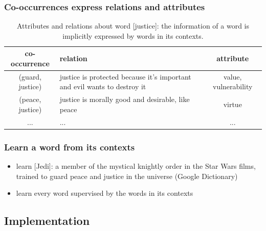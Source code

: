 \documentclass{article}
\begin{document}
\subsubsection{Co-occurrences express relations and attributes}
\begin{table}[H]
	\centering
	\begin{tabularx}{\textwidth}{|c|X|c|} \hline
		co-occurrence & relation & attribute \\ \hline
		(guard, justice) & justice is protected because it's important and evil wants to destroy it & value, vulnerability \\ \hline
		(peace, justice) & justice is morally good and desirable, like peace & virtue \\ \hline
		... & ... & ... \\ \hline
	\end{tabularx}
	\caption{Attributes and relations about word [justice]: the information of a word is implicitly expressed by words in its contexts.}
	\label{tab:cooccurrences}
\end{table}
\subsubsection{Learn a word from its contexts}
\begin{itemize}
	\item learn [Jedi]: a member of the mystical knightly order in the Star Wars films, trained to guard peace and justice in the universe (Google Dictionary)
	\item learn every word supervised by the words in its contexts
\end{itemize}

\subsection{Implementation}
\end{document}
